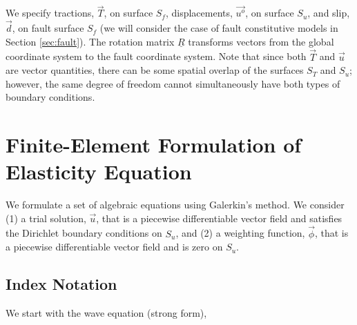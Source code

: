 We specify tractions, $\vec{T}$, on surface $S_{f}$, displacements,
$\overrightarrow{u^{o}}$, on surface $S_{u}$, and slip, $\vec{d}$,
on fault surface $S_{f}$ (we will consider the case of fault constitutive
models in Section \ref{sec:fault}). The rotation matrix $\underline{R}$
transforms vectors from the global coordinate system to the fault
coordinate system. Note that since both $\overrightarrow{T}$ and
$\overrightarrow{u}$ are vector quantities, there can be some spatial
overlap of the surfaces $S_{T}$ and $S_{u}$; however, the same degree
of freedom cannot simultaneously have both types of boundary conditions.


\section{Finite-Element Formulation of Elasticity Equation}

We formulate a set of algebraic equations using Galerkin's method.
We consider (1) a trial solution, $\vec{u}$, that is a piecewise
differentiable vector field and satisfies the Dirichlet boundary conditions
on $S_{u}$, and (2) a weighting function, $\vec{\phi}$, that is
a piecewise differentiable vector field and is zero on $S_{u}$.


\subsection{Index Notation}

We start with the wave equation (strong form),

